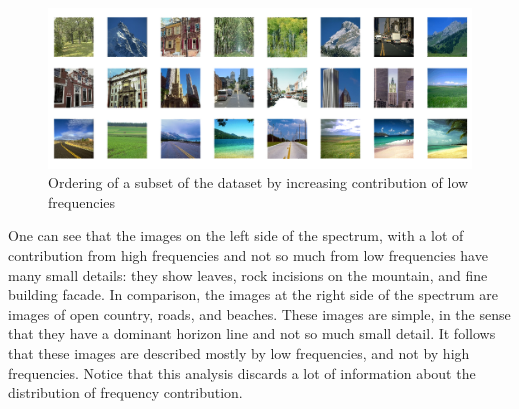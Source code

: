 \documentclass{report}
\begin{document}
\begin{figure}[hbtp]
\centering
\includegraphics[scale=0.3]{graphics/FrequencyOrdered.png}
\caption{Ordering of a subset of the dataset by increasing contribution of low frequencies}
\label{fig:fft_low_freq_order}
\end{figure}

One can see that the images on the left side of the spectrum, with a lot of contribution from high frequencies and not so much from low frequencies have many small details: they show leaves, rock incisions on the mountain, and fine building facade. In comparison, the images at the right side of the spectrum are images of open country, roads, and beaches. These images are simple, in the sense that they have a dominant horizon line and not so much small detail. It follows that these images are described mostly by low frequencies, and not by high frequencies. Notice that this analysis discards a lot of information about the distribution of frequency contribution.
\end{document}
